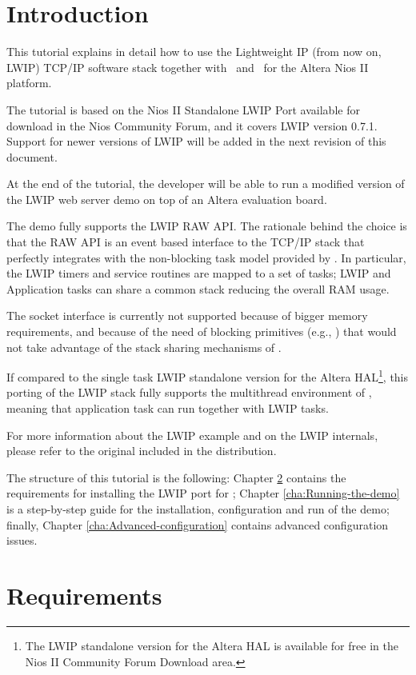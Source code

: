 \chapter{Introduction}

This tutorial explains in detail how to use the Lightweight IP (from
now on, LWIP) TCP/IP software stack \cite{LWIP} together with \rtd\
and \ee\ for the Altera Nios II platform.

The tutorial is based on the Nios II Standalone LWIP Port available
for download in the Nios Community Forum, and it covers LWIP version
0.7.1. Support for newer versions of LWIP will be added in the next
revision of this document.

At the end of the tutorial, the developer will be able to run a
modified version of the LWIP web server demo on top of an Altera
evaluation board.

The demo fully supports the LWIP RAW API. The rationale behind the
choice is that the RAW API is an event based interface to the TCP/IP
stack that perfectly integrates with the non-blocking task model
provided by \ee. In particular, the LWIP timers and service routines
are mapped to a set of tasks; LWIP and Application tasks can share a
common stack reducing the overall RAM usage.

The socket interface is currently not supported because of bigger
memory requirements, and because of the need of blocking primitives
(e.g., \fn{select}) that would not take advantage of the stack sharing
mechanisms of \ee.

If compared to the single task LWIP standalone version for the Altera
HAL\footnote{The LWIP standalone version for the Altera HAL is
available for free in the Nios II Community Forum Download area.},
this porting of the LWIP stack fully supports the multithread
environment of \ee, meaning that application task can run
together with LWIP tasks.

For more information about the LWIP example and on the LWIP internals,
please refer to the original \file{readme.txt} included in the
distribution.

The structure of this tutorial is the following: Chapter
\ref{cha:Requirements} contains the requirements for installing the
LWIP port for \ee; Chapter \ref{cha:Running-the-demo} is
a step-by-step guide for the installation, configuration and run of
the demo; finally, Chapter \ref{cha:Advanced-configuration} contains
advanced configuration issues.


\chapter{Requirements}
\label{cha:Requirements}


